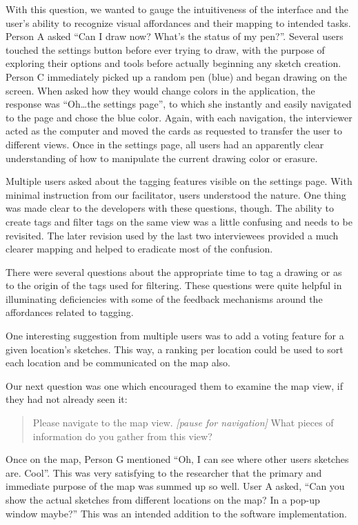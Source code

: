 \documentclass{chi2009}
\begin{document}
With this question, we wanted to gauge the intuitiveness of the interface and
the user's ability to recognize visual affordances and their mapping to
intended tasks.  Person A asked ``Can I draw now?  What's the status of my
pen?''.  Several users touched the settings button before ever trying to draw,
with the purpose of exploring their options and tools before actually beginning
any sketch creation.  Person C immediately picked up a random pen (blue) and
began drawing on the screen.  When asked how they would change colors in the
application, the response was ``Oh\ldots  the settings page'', to which she
instantly and easily navigated to the page and chose the blue color.  Again,
with each navigation, the interviewer acted as the computer and moved the cards
as requested to transfer the user to different views.  Once in the settings
page, all users had an apparently clear understanding of how to manipulate the
current drawing color or erasure.

Multiple users asked about the tagging features visible on the settings page.
With minimal instruction from our facilitator, users understood the nature.
One thing was made clear to the developers with these questions, though.  The
ability to create tags and filter tags on the same view was a little confusing
and needs to be revisited.  The later revision used by the last two
interviewees provided a much clearer mapping and helped to eradicate most of
the confusion.

There were several questions about the appropriate time to tag a drawing or as
to the origin of the tags used for filtering.  These questions were quite
helpful in illuminating deficiencies with some of the feedback mechanisms
around the affordances related to tagging.

One interesting suggestion from multiple users was to add a voting feature for
a given location's sketches.  This way, a ranking per location could be used to
sort each location and be communicated on the map also.

Our next question was one which encouraged them to examine the map view, if
they had not already seen it:
\begin{quote}
Please navigate to the map view. {\it [pause for navigation]}
What pieces of information do you gather from this view?
\end{quote}

Once on the map, Person G mentioned ``Oh, I can see where other users sketches
are.  Cool''.  This was very satisfying to the researcher that the primary and
immediate purpose of the map was summed up so well.  User A asked, ``Can you
show the actual sketches from different locations on the map? In a pop-up
window maybe?''  This was an intended addition to the software implementation.
\end{document}
